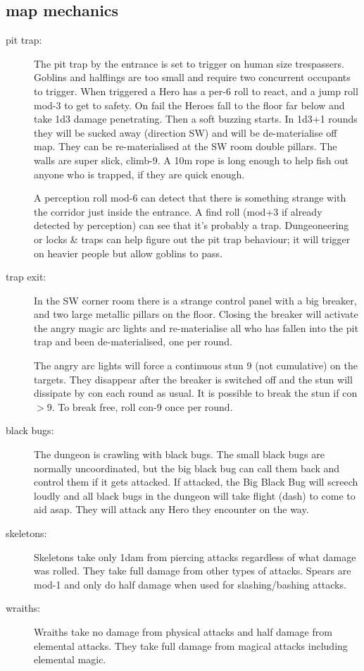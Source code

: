 \subsection*{map mechanics}

\begin{description}
\item[pit trap:] The pit trap by the entrance is set to trigger on human size trespassers. Goblins and halflings are too small and require two concurrent occupants to trigger. When triggered a Hero has a per-6 roll to react, and a jump roll mod-3 to get to safety. On fail the Heroes fall to the floor far below and take 1d3 damage penetrating. Then a soft buzzing starts. In 1d3+1 rounds they will be sucked away (direction SW) and will be de-materialise off map. They can be re-materialised at the SW room double pillars.
The walls are super slick, climb-9. A 10m rope is long enough to help fish out anyone who is trapped, if they are quick enough.

A perception roll mod-6 can detect that there is something strange with the corridor just inside the entrance. A find roll (mod+3 if already detected by perception) can see that it's probably a trap. Dungeoneering or locks \& traps can help figure out the pit trap behaviour; it will trigger on heavier people but allow goblins to pass.

\item[trap exit:] In the SW corner room there is a strange control panel with a big breaker, and two large metallic pillars on the floor. Closing the breaker will activate the angry magic arc lights and re-materialise all who has fallen into the pit trap and been de-materialised, one per round.

The angry arc lights will force a continuous stun 9 (not cumulative) on the targets. They disappear after the breaker is switched off and the stun will dissipate by con each round as usual. It is possible to break the stun if con $>$9. To break free, roll con-9 once per round.

\item[black bugs:] The dungeon is crawling with black bugs. The small black bugs are normally uncoordinated, but the big black bug can call them back and control them if it gets attacked. If attacked, the Big Black Bug will screech loudly and all black bugs in the dungeon will take flight (dash) to come to aid asap. They will attack any Hero they encounter on the way.

\item[skeletons:] Skeletons take only 1dam from piercing attacks regardless of what damage was rolled. They take full damage from other types of attacks. Spears are mod-1 and only do half damage when used for slashing/bashing attacks.

\item[wraiths:] Wraiths take no damage from physical attacks and half damage from elemental attacks. They take full damage from magical attacks including elemental magic.
\end{description}


